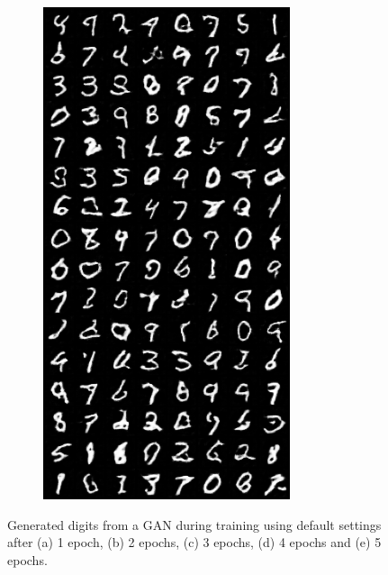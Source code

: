 \begin{figure}[H]
\begin{subfigure}{0.2\textwidth}
        \includegraphics[width=0.95\linewidth]{GAN/fake_sample_epoch_0005.png}
        \caption{}
        \label{subfig:GAN/fake_sample_epoch_0005}
    \end{subfigure}

    

    \caption{Generated digits from a GAN during training using default settings after (a) 1 epoch, (b) 2 epochs, (c) 3 epochs, (d) 4 epochs and (e) 5 epochs.}
    \label{fig:GAN_default}
\end{figure}



